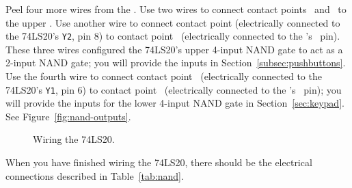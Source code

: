 Peel four more wires from the \rainbow.
Use two wires to connect contact points \nandupperc\ and \nandupperd\ to the upper \power.
Use another wire to connect contact point \nanduppery (electrically connected to the 74LS20's \texttt{Y2}, pin 8) to contact point \mcubuttonnandpoint\ (electrically connected to the \developmentboard's \mcubuttonnand\ pin).
These three wires configured the 74LS20's upper 4-input NAND gate to act as a 2-input NAND gate;
you will provide the inputs in Section~\ref{subsec:pushbuttons}.
Use the fourth wire to connect contact point \nandlowery\ (electrically connected to the 74LS20's \texttt{Y1}, pin 6) to contact point \mcukeypadnandpoint\ (electrically connected to the \developmentboard's \mcukeypadnand\ pin);
you will  provide the inputs for the lower 4-input NAND gate in Section~\ref{sec:keypad}.
See Figure~\ref{fig:nand-outputs}.

\begin{figure}
    \centering
    \hfil
    \caption{Wiring the 74LS20.}
\end{figure}

When you have finished wiring the 74LS20, there should be the electrical connections described in Table~\ref{tab:nand}.

